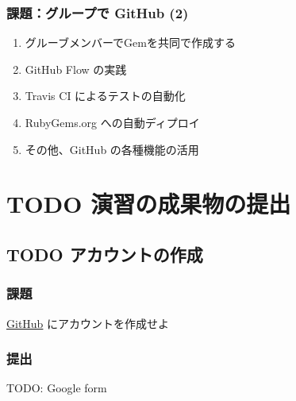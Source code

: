\documentclass[a4paper,twoside,twocolumn]{bxjsarticle}
\begin{document}
\subsubsection{課題：グループで GitHub (2)}
\label{sec-4-2-2}
\begin{enumerate}
\item グルーブメンバーでGemを共同で作成する
\item GitHub Flow の実践
\item Travis CI によるテストの自動化
\item RubyGems.org への自動ディプロイ
\item その他、GitHub の各種機能の活用
\end{enumerate}

\section{{\bfseries\sffamily TODO} 演習の成果物の提出}
\label{sec-5}
\subsection{{\bfseries\sffamily TODO} アカウントの作成}
\label{sec-5-1}
\subsubsection{課題}
\label{sec-5-1-1}
\href{https://github.com/}{GitHub} にアカウントを作成せよ
\subsubsection{提出}
\label{sec-5-1-2}
TODO: Google form
\end{document}
